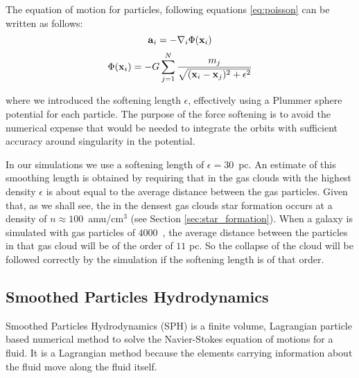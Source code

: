 The equation of motion for particles, following equations \eqref{eq:poisson} can be written as follows:
\begin{equation}
 \boldsymbol{\mathbf{a}}_i = -\nabla_i \Phi(\boldsymbol{\mathbf{x}}_i)
\end{equation}
\begin{equation}
 \Phi(\boldsymbol{\mathbf{x}}_i) = -G \sum^N_{j=1}\frac{m_j}{\sqrt{(\boldsymbol{\mathbf{x}}_i-\boldsymbol{\mathbf{x}}_j)^2 + \epsilon^2}}
\end{equation}

where we introduced the softening length $\epsilon$, effectively using a Plummer sphere potential for each particle.
The purpose of the force softening is to avoid the numerical expense that would be needed to integrate the orbits with sufficient accuracy around singularity in the potential.

In our simulations we use a softening length of $\epsilon=30$~pc. An estimate of this smoothing length is obtained by requiring that in the gas clouds with the highest density $\epsilon$ is about equal to the average distance between the gas particles. %
Given that, as we shall see, the in the densest gas clouds star formation occurs at a density of $n\approx100$~amu/cm$^{3}$ (see Section \ref{sec:star_formation}).
When a galaxy is simulated with gas particles of $4000$~\Msun{}, the average distance between the particles in that gas cloud will be of the order of $11$ pc.
So the collapse of the cloud will be followed correctly by the simulation if the softening length is of that order.

\subsection{Smoothed Particles Hydrodynamics}
Smoothed Particles Hydrodynamics (SPH) is a finite volume, Lagrangian particle based numerical method to solve the Navier-Stokes equation of motions for a fluid.
It is a Lagrangian method because the elements carrying information about the fluid move along the fluid itself.

